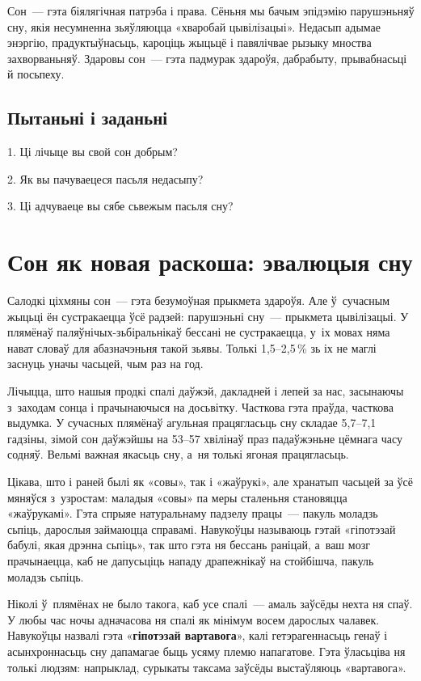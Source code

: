 Сон~--- гэта біялягічная патрэба і права. Сёньня мы бачым эпідэмію парушэньняў сну, якія несумненна зьяўляюцца «хваробай цывілізацыі». Недасып адымае энэргію, прадуктыўнасьць, кароціць жыцьцё і павялічвае рызыку мноства захворваньняў. Здаровы сон~--- гэта падмурак здароўя, дабрабыту, прывабнасьці й посьпеху.

\subsection*{Пытаньні і заданьні}

1. Ці лічыце вы свой сон добрым?

2. Як вы пачуваецеся пасьля недасыпу?

3. Ці адчуваеце вы сябе сьвежым пасьля сну?


\section{Сон як новая раскоша: эвалюцыя сну}

Салодкі ціхмяны сон~--- гэта безумоўная прыкмета здароўя. Але ў~сучасным жыцьці ён сустракаецца ўсё радзей: парушэньні сну~--- прыкмета цывілізацыі. У плямёнаў паляўнічых-зьбіральнікаў бессані не сустракаецца, у~іх мовах няма нават словаў для абазначэньня такой зьявы. Толькі 1,5--2,5\,\% зь іх не маглі заснуць уначы часьцей, чым раз на год. 


Лічыцца, што нашыя продкі спалі даўжэй, дакладней і лепей за нас, засынаючы з~заходам сонца і прачынаючыся на досьвітку. Часткова гэта праўда, часткова выдумка. У сучасных плямёнаў агульная працягласьць сну складае 5,7--7,1 гадзіны, зімой сон даўжэйшы на 53--57 хвілінаў праз падаўжэньне цёмнага часу содняў. Вельмі важная якасьць сну, а~ня толькі ягоная працягласьць.

Цікава, што і раней былі як «совы», так і «жаўрукі», але хранатып часьцей за ўсё мяняўся з~узростам: маладыя «совы» па меры сталеньня становяцца «жаўрукамі». Гэта спрыяе натуральнаму падзелу працы~--- пакуль моладзь сьпіць, дарослыя займаюцца справамі. Навукоўцы называюць гэтай «гіпотэзай бабулі, якая дрэнна сьпіць», так што гэта ня бессань раніцай, а~ваш мозг прачынаецца, каб не дапусьціць нападу драпежнікаў на стойбішча, пакуль моладзь сьпіць.

Ніколі ў~плямёнах не было такога, каб усе спалі~--- амаль заўсёды нехта ня спаў. У любы час ночы адначасова ня спалі як мінімум восем дарослых чалавек. Навукоўцы назвалі гэта «\textbf{гіпотэзай вартавога}», калі гетэрагеннасьць генаў і асынхроннасьць сну дапамагае быць усяму племю напагатове. Гэта ўласьціва ня толькі людзям: напрыклад, сурыкаты таксама заўсёды выстаўляюць «вартавога».

